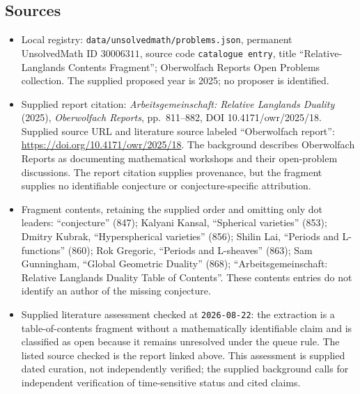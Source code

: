 \documentclass[11pt]{article}
\begin{document}
\subsection{Sources}
\begin{itemize}
\item Local registry: \texttt{data/unsolvedmath/problems.json}, permanent UnsolvedMath ID \(30006311\), source code \texttt{catalogue entry}, title ``Relative-Langlands Contents Fragment''; Oberwolfach Reports Open Problems collection. The supplied proposed year is 2025; no proposer is identified.
\item Supplied report citation: \emph{Arbeitsgemeinschaft: Relative Langlands Duality} (2025), \emph{Oberwolfach Reports}, pp.\ 811--882, DOI 10.4171/owr/2025/18. Supplied source URL and literature source labeled ``Oberwolfach report'': \url{https://doi.org/10.4171/owr/2025/18}. The background describes Oberwolfach Reports as documenting mathematical workshops and their open-problem discussions. The report citation supplies provenance, but the fragment supplies no identifiable conjecture or conjecture-specific attribution.
\item Fragment contents, retaining the supplied order and omitting only dot leaders: ``conjecture'' (847); Kalyani Kansal, ``Spherical varieties'' (853); Dmitry Kubrak, ``Hyperspherical varieties'' (856); Shilin Lai, ``Periods and L-functions'' (860); Rok Gregoric, ``Periods and L-sheaves'' (863); Sam Gunningham, ``Global Geometric Duality'' (868); ``Arbeitsgemeinschaft: Relative Langlands Duality Table of Contents''. These contents entries do not identify an author of the missing conjecture.
\item Supplied literature assessment checked at \texttt{2026-08-22}: the extraction is a table-of-contents fragment without a mathematically identifiable claim and is classified as open because it remains unresolved under the queue rule. The listed source checked is the report linked above. This assessment is supplied dated curation, not independently verified; the supplied background calls for independent verification of time-sensitive status and cited claims.
\end{itemize}
\end{document}
